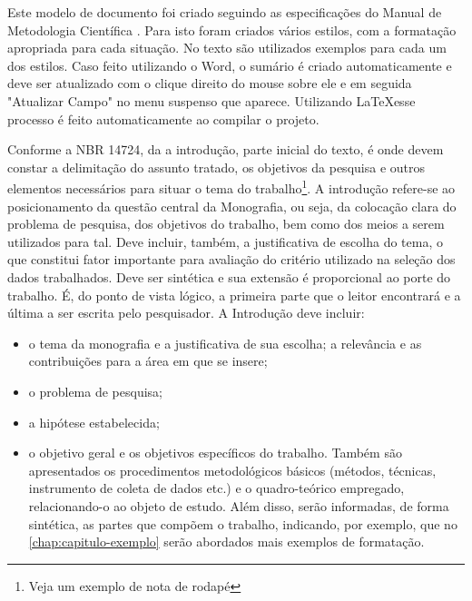 Este modelo de documento foi criado seguindo as especificações do Manual de Metodologia Científica \cite{prodanov}. Para isto foram criados vários estilos, com a formatação apropriada para cada situação. No texto são utilizados exemplos para cada um dos estilos. Caso feito utilizando o Word, o sumário é criado automaticamente e deve ser atualizado com o clique direito do mouse sobre ele e em seguida "Atualizar Campo" no menu suspenso que aparece. Utilizando \LaTeX esse processo é feito automaticamente ao compilar o projeto.

Conforme a NBR 14724, da  a introdução, parte inicial do texto, é onde devem constar a delimitação do assunto tratado, os objetivos da pesquisa e outros elementos necessários para situar o tema do trabalho\footnote{Veja um exemplo de nota de rodapé}. A introdução refere-se ao posicionamento da questão central da Monografia, ou seja, da colocação clara do problema de pesquisa, dos objetivos do trabalho, bem como dos meios a serem utilizados para tal. Deve incluir, também, a justificativa de escolha do tema, o que constitui fator importante para avaliação do critério utilizado na seleção dos dados trabalhados.
Deve ser sintética e sua extensão é proporcional ao porte do trabalho. É, do ponto de vista lógico, a primeira parte que o leitor encontrará e a última a ser escrita pelo pesquisador.
A Introdução deve incluir:
\begin{itemize}
    \item o tema da monografia e a justificativa de sua escolha; a relevância e as contribuições para a área em que se insere;
    \item o problema de pesquisa;
    \item a hipótese estabelecida;
    \item o objetivo geral e os objetivos específicos do trabalho. Também são apresentados os procedimentos metodológicos básicos (métodos, técnicas, instrumento de coleta de dados etc.) e o quadro-teórico empregado, relacionando-o ao objeto de estudo. Além disso, serão informadas, de forma sintética, as partes que compõem o trabalho, indicando, por exemplo, que no \autoref{chap:capitulo-exemplo} serão abordados mais exemplos de formatação.
\end{itemize}